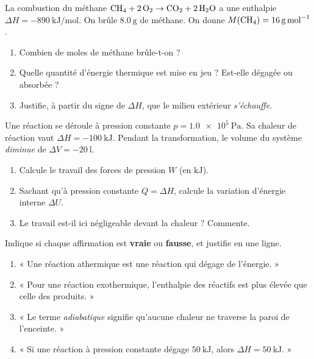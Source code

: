 \documentclass[11pt,a4paper]{article}
\begin{document}
\begin{exo}
La combustion du méthane $\ce{CH4} + 2\,\ce{O2} \rightarrow \ce{CO2} + 2\,\ce{H2O}$ a une enthalpie $\Delta H = \qty{-890}{\kilo\joule\per\mol}$. On brûle $\qty{8.0}{\gram}$ de méthane. On donne $M(\ce{CH4})=\qty{16}{\gram\per\mol}$.
\begin{enumerate}[label=\alph*)]
  \item Combien de moles de méthane brûle-t-on ?
  \item Quelle quantité d'énergie thermique est mise en jeu ? Est-elle dégagée ou absorbée ?
  \item Justifie, à partir du signe de $\Delta H$, que le milieu extérieur \emph{s'échauffe}.
\end{enumerate}
\end{exo}

\begin{exo}
Une réaction se déroule à pression constante $p=\qty{1.0e5}{\pascal}$. Sa chaleur de réaction vaut $\Delta H = \qty{-100}{\kilo\joule}$. Pendant la transformation, le volume du système \emph{diminue} de $\Delta V = \qty{-20}{\litre}$.
\begin{enumerate}[label=\alph*)]
  \item Calcule le travail des forces de pression $W$ (en $\si{\kilo\joule}$).
  \item Sachant qu'à pression constante $Q=\Delta H$, calcule la variation d'énergie interne $\Delta U$.
  \item Le travail est-il ici négligeable devant la chaleur ? Commente.
\end{enumerate}
\end{exo}

\begin{exo}
Indique si chaque affirmation est \textbf{vraie} ou \textbf{fausse}, et justifie en une ligne.
\begin{enumerate}[label=\alph*)]
  \item « Une réaction athermique est une réaction qui dégage de l'énergie. »
  \item « Pour une réaction exothermique, l'enthalpie des réactifs est plus élevée que celle des produits. »
  \item « Le terme \emph{adiabatique} signifie qu'aucune chaleur ne traverse la paroi de l'enceinte. »
  \item « Si une réaction à pression constante dégage $\qty{50}{\kilo\joule}$, alors $\Delta H = \qty{+50}{\kilo\joule}$. »
\end{enumerate}
\end{exo}
\end{document}
